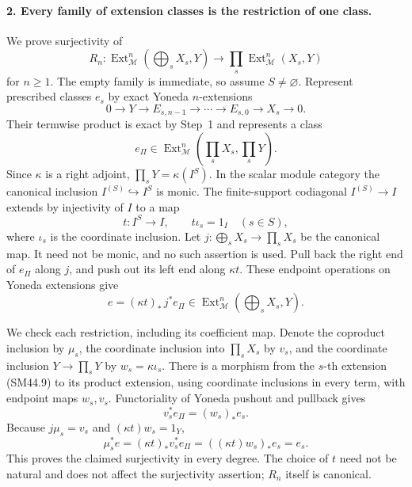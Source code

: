 \paragraph{2. Every family of extension classes is the restriction of one class.}
We prove surjectivity of
\[
 R_n:\operatorname{Ext}^n_{\mathcal M}\!\left(\bigoplus_sX_s,Y\right)
              \longrightarrow\prod_s\operatorname{Ext}^n_{\mathcal M}(X_s,Y)
                                                               \tag{SM44.8}
\]
for \(n\ge1\).  The empty family is immediate, so assume
\(S\ne\varnothing\).  Represent prescribed classes \(e_s\)
by exact Yoneda \(n\)-extensions
\[
 0\longrightarrow Y\longrightarrow E_{s,n-1}
      \longrightarrow\cdots\longrightarrow E_{s,0}
      \longrightarrow X_s\longrightarrow0.
                                                               \tag{SM44.9}
\]
Their termwise product is exact by Step~1 and represents a class
\[
             e_{\Pi}\in
 \operatorname{Ext}^n_{\mathcal M}\!\left(\prod_sX_s,\prod_sY\right).
\]
Since \(\kappa\) is a right adjoint, \(\prod_sY=\kappa(I^S)\).
In the scalar module category the canonical inclusion
\(I^{(S)}\hookrightarrow I^S\) is monic.  The finite-support
codiagonal \(I^{(S)}\to I\) extends by injectivity of \(I\)
to a map
\[
                   t:I^S\longrightarrow I,
                   \qquad t\iota_s=1_I\quad(s\in S),         \tag{SM44.10}
\]
where \(\iota_s\) is the coordinate inclusion.
Let \(j:\bigoplus_sX_s\to\prod_sX_s\) be the canonical
map.  It need not be monic, and no such assertion is used.
Pull back the right end of \(e_{\Pi}\) along \(j\), and
push out its left end along \(\kappa t\).  These endpoint
operations on Yoneda extensions give
\[
                   e=(\kappa t)_*\,j^*e_{\Pi}
              \in\operatorname{Ext}^n_{\mathcal M}
                         \!\left(\bigoplus_sX_s,Y\right).     \tag{SM44.11}
\]

We check each restriction, including its coefficient map.
Denote the coproduct inclusion by \(\mu_s\), the coordinate
inclusion into \(\prod_sX_s\) by \(v_s\), and the coordinate
inclusion \(Y\to\prod_sY\) by \(w_s=\kappa\iota_s\).
There is a morphism from the \(s\)-th extension (SM44.9) to
its product extension, using coordinate inclusions in every
term, with endpoint maps \(w_s,v_s\).  Functoriality of
Yoneda pushout and pullback gives
\[
                 v_s^*e_{\Pi}=(w_s)_*e_s.
\]
Because \(j\mu_s=v_s\) and \((\kappa t)w_s=1_Y\),
\[
 \mu_s^* e
   =(\kappa t)_*v_s^*e_{\Pi}
   =((\kappa t)w_s)_*e_s=e_s.                               \tag{SM44.12}
\]
This proves the claimed surjectivity in every degree.  The
choice of \(t\) need not be natural and does not affect the
surjectivity assertion; \(R_n\) itself is canonical.

